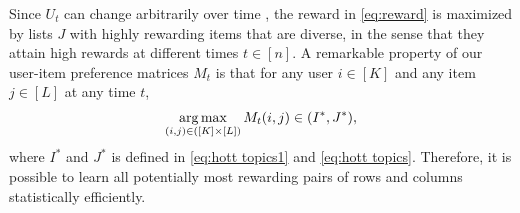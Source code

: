 



Since $U_t$ can change arbitrarily over time , the reward in \eqref{eq:reward} is maximized by lists $J$ with highly rewarding items that are diverse, in the sense that they attain high rewards at different times $t \in [n]$. A remarkable property of our user-item preference matrices $M_t$ is that for any user $i \in [K]$ and any item $j \in [L]$ at any time $t$,
\begin{align*}
  \mathop{\rm arg\,max}_{(i, j) \in ([K] \times [L])} M_t(i, j) \in (I^\ast, J^\ast),
\end{align*}
where $I^\ast$ and $J^\ast$ is defined in \eqref{eq:hott topics1} and \eqref{eq:hott topics}. Therefore, it is possible to learn all potentially most rewarding pairs of rows and columns statistically efficiently.

